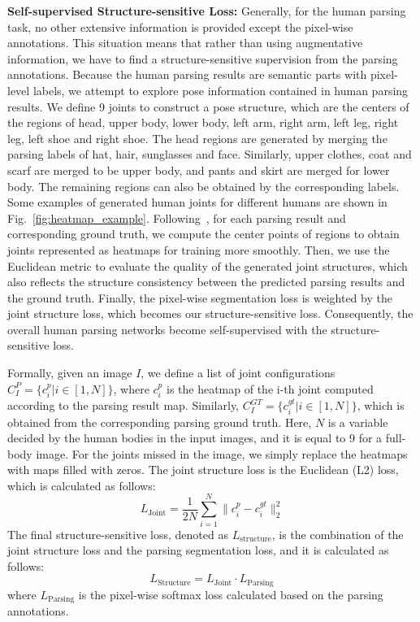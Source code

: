 \documentclass[10pt,journal,compsoc]{IEEEtran}
\begin{document}
\textbf{Self-supervised Structure-sensitive Loss: }
Generally, for the human parsing task, no other extensive information is provided except the pixel-wise annotations. This situation means that rather than using augmentative information, we have to find a structure-sensitive supervision from the parsing annotations. Because the human parsing results are semantic parts with pixel-level labels, we attempt to explore pose information contained in human parsing results. We define 9 joints to construct a pose structure, which are the centers of the regions of head, upper body, lower body, left arm, right arm, left leg, right leg, left shoe and right shoe. The head regions are generated by merging the parsing labels of hat, hair, sunglasses and face. Similarly, upper clothes, coat and scarf are merged to be upper body, and pants and skirt are merged for lower body. The remaining regions can also be obtained by the corresponding labels. Some examples of generated human joints for different humans are shown in Fig.~\ref{fig:heatmap_example}. Following~\cite{Pfister15a}, for each parsing result and corresponding ground truth, we compute the center points of regions to obtain joints represented as heatmaps for training more smoothly. Then, we use the Euclidean metric to evaluate the quality of the generated joint structures, which also reflects the structure consistency between the predicted parsing results and the ground truth. Finally, the pixel-wise segmentation loss is weighted by the joint structure loss, which becomes our structure-sensitive loss. Consequently, the overall human parsing networks become self-supervised with the structure-sensitive loss. 

Formally, given an image $I$, we define a list of joint configurations $C^{P}_I = \{c^{p}_i|i\in[1,N]\}$, where $c^{p}_i$ is the heatmap of the i-th joint computed according to the parsing result map. Similarly, $C^{GT}_I = \{c^{gt}_i|i\in[1,N]\}$, which is obtained from the corresponding parsing ground truth. Here, $N$ is a variable decided by the human bodies in the input images, and it is equal to 9 for a full-body image. For the joints missed in the image, we simply replace the heatmaps with maps filled with zeros. The joint structure loss is the Euclidean (L2) loss, which is calculated as follows:
\begin{equation}
L_{\text{Joint}} = \frac{1}{2N} \sum \limits_{i=1}^N \| c^{p}_i - c_i^{gt} \|_2^2
\end{equation}
The final structure-sensitive loss, denoted as $L_{\text{structure}}$, is the combination of the joint structure loss and the parsing segmentation loss, and it is calculated as follows:
\begin{equation}
L_{\text{Structure}} = L_{\text{Joint}} \cdot L_{\text{Parsing}}
\end{equation}
where $L_{\text{Parsing}}$ is the pixel-wise softmax loss calculated based on the parsing annotations.
\end{document}
